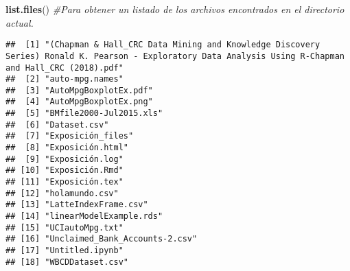 \documentclass[]{article}
\newenvironment{Shaded}{\begin{snugshade}}{\end{snugshade}}
\newcommand{\CommentTok}[1]{\textcolor[rgb]{0.56,0.35,0.01}{\textit{#1}}}
\newcommand{\KeywordTok}[1]{\textcolor[rgb]{0.13,0.29,0.53}{\textbf{#1}}}
\newcommand{\NormalTok}[1]{#1}
\begin{document}
\begin{Shaded}
\begin{Highlighting}[]
\KeywordTok{list.files}\NormalTok{() }\CommentTok{#Para obtener un listado de los archivos encontrados en el directorio actual.}
\end{Highlighting}
\end{Shaded}

\begin{verbatim}
##  [1] "(Chapman & Hall_CRC Data Mining and Knowledge Discovery Series) Ronald K. Pearson - Exploratory Data Analysis Using R-Chapman and Hall_CRC (2018).pdf"
##  [2] "auto-mpg.names"                                                                                                                                       
##  [3] "AutoMpgBoxplotEx.pdf"                                                                                                                                 
##  [4] "AutoMpgBoxplotEx.png"                                                                                                                                 
##  [5] "BMfile2000-Jul2015.xls"                                                                                                                               
##  [6] "Dataset.csv"                                                                                                                                          
##  [7] "Exposición_files"                                                                                                                                     
##  [8] "Exposición.html"                                                                                                                                      
##  [9] "Exposición.log"                                                                                                                                       
## [10] "Exposición.Rmd"                                                                                                                                       
## [11] "Exposición.tex"                                                                                                                                       
## [12] "holamundo.csv"                                                                                                                                        
## [13] "LatteIndexFrame.csv"                                                                                                                                  
## [14] "linearModelExample.rds"                                                                                                                               
## [15] "UCIautoMpg.txt"                                                                                                                                       
## [16] "Unclaimed_Bank_Accounts-2.csv"                                                                                                                        
## [17] "Untitled.ipynb"                                                                                                                                       
## [18] "WBCDDataset.csv"
\end{verbatim}
\end{document}
